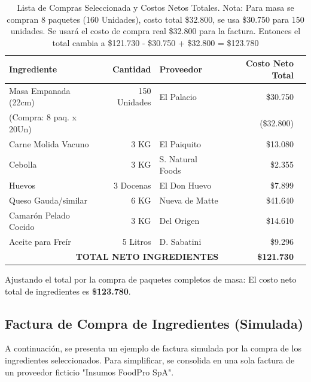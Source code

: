 \documentclass[12pt]{article}
\begin{document}
\begin{table}[h!]
    \centering
    \begin{tabular}{||l | r | l | r | r ||} 
        \hline
        \textbf{Ingrediente} & \textbf{Cantidad} & \textbf{Proveedor} & \textbf{Costo Neto Total} \\ [0.5ex]
        \hline\hline
        Masa Empanada (22cm) & 150 Unidades & El Palacio & \$30.750 \\ 
        (Compra: 8 paq. x 20Un) & & & (\$32.800) \\ \hline
        Carne Molida Vacuno & 3 KG & El Paiquito & \$13.080 \\ \hline
        Cebolla & 3 KG & S. Natural Foods & \$2.355 \\ \hline
        Huevos & 3 Docenas & El Don Huevo & \$7.899 \\ \hline
        Queso Gauda/similar & 6 KG & Nueva de Matte & \$41.640 \\ \hline
        Camarón Pelado Cocido & 3 KG & Del Origen & \$14.610 \\ \hline
        Aceite para Freír & 5 Litros & D. Sabatini & \$9.296 \\ \hline \hline
        \multicolumn{3}{||r|}{\textbf{TOTAL NETO INGREDIENTES}} & \textbf{\$121.730} \\ [0.5ex] 
        \hline
    \end{tabular}
    \caption{Lista de Compras Seleccionada y Costos Netos Totales. Nota: Para masa se compran 8 paquetes (160 Unidades), costo total \$32.800, se usa \$30.750 para 150 unidades. Se usará el costo de compra real \$32.800 para la factura. Entonces el total cambia a \$121.730 - \$30.750 + \$32.800 = \$123.780}
    \label{tab:lista_compras_final}
\end{table}
Ajustando el total por la compra de paquetes completos de masa: El costo neto total de ingredientes es \textbf{\$123.780}.

\subsection{Factura de Compra de Ingredientes (Simulada)}
A continuación, se presenta un ejemplo de factura simulada por la compra de los ingredientes seleccionados. Para simplificar, se consolida en una sola factura de un proveedor ficticio "Insumos FoodPro SpA".
\end{document}
